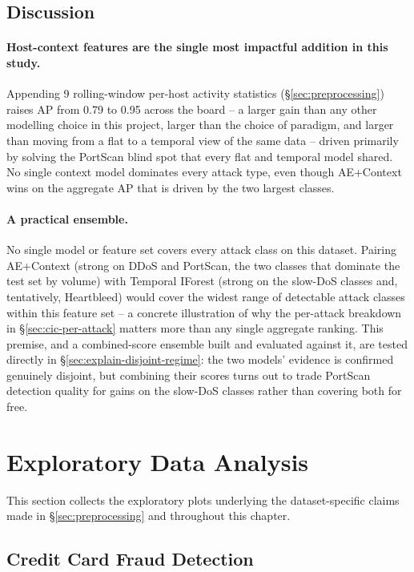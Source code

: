 \subsection{Discussion}

\paragraph{Host-context features are the single most impactful addition in this study.} Appending 9 rolling-window per-host activity statistics (\S\ref{sec:preprocessing}) raises AP from 0.79 to 0.95 across the board -- a larger gain than any other modelling choice in this project, larger than the choice of paradigm, and larger than moving from a flat to a temporal view of the same data -- driven primarily by solving the PortScan blind spot that every flat and temporal model shared. No single context model dominates every attack type, even though AE+Context wins on the aggregate AP that is driven by the two largest classes.

\paragraph{A practical ensemble.} No single model or feature set covers every attack class on this dataset. Pairing AE+Context (strong on DDoS and PortScan, the two classes that dominate the test set by volume) with Temporal IForest (strong on the slow-DoS classes and, tentatively, Heartbleed) would cover the widest range of detectable attack classes within this feature set -- a concrete illustration of why the per-attack breakdown in \S\ref{sec:cic-per-attack} matters more than any single aggregate ranking. This premise, and a combined-score ensemble built and evaluated against it, are tested directly in \S\ref{sec:explain-disjoint-regime}: the two models' evidence is confirmed genuinely disjoint, but combining their scores turns out to trade PortScan detection quality for gains on the slow-DoS classes rather than covering both for free.

\section{Exploratory Data Analysis}
\label{sec:eda}

This section collects the exploratory plots underlying the dataset-specific claims made in \S\ref{sec:preprocessing} and throughout this chapter.

\subsection{Credit Card Fraud Detection}

